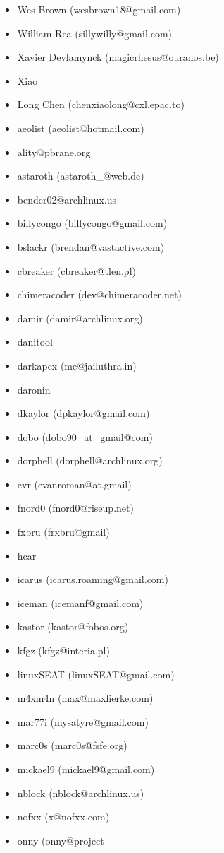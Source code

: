 \begin{itemize}
\item  Wes Brown (wesbrown18@gmail.com)
\item  William Rea (sillywilly@gmail.com)
\item  Xavier Devlamynck (magicrhesus@ouranos.be)
\item  Xiao\item Long Chen (chenxiaolong@cxl.epac.to)
\item  aeolist (aeolist@hotmail.com)
\item  ality@pbrane.org
\item  astaroth (astaroth\_@web.de)
\item  bender02@archlinux.us
\item  billycongo (billycongo@gmail.com)
\item  bslackr (brendan@vastactive.com)
\item  cbreaker (cbreaker@tlen.pl)
\item  chimeracoder (dev@chimeracoder.net)
\item  damir (damir@archlinux.org)
\item  danitool
\item  darkapex (me@jailuthra.in)
\item  daronin
\item  dkaylor (dpkaylor@gmail.com)
\item  dobo (dobo90\_at\_gmail@com)
\item  dorphell (dorphell@archlinux.org)
\item  evr (evanroman@at.gmail)
\item  fnord0 (fnord0@riseup.net)
\item  fxbru (frxbru@gmail)
\item  hcar
\item  icarus (icarus.roaming@gmail.com)
\item  iceman (icemanf@gmail.com)
\item  kastor (kastor@fobos.org)
\item  kfgz (kfgz@interia.pl)
\item  linuxSEAT (linuxSEAT@gmail.com)
\item  m4xm4n (max@maxfierke.com)
\item  mar77i (mysatyre@gmail.com)
\item  marc0s (marc0s@fsfe.org)
\item  mickael9 (mickael9@gmail.com)
\item  nblock (nblock@archlinux.us)
\item  nofxx (x@nofxx.com)
\item  onny (onny@project

\end{itemize}
